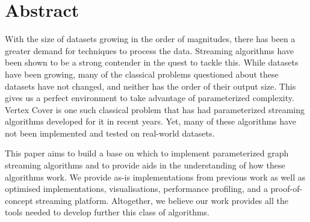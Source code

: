\section*{Abstract}

With the size of datasets growing in the order of magnitudes, there has been a
greater demand for techniques to process the data. Streaming algorithms have
been shown to be a strong contender in the quest to tackle this. While datasets
have been growing, many of the classical problems questioned about these
datasets have not changed, and neither has the order of their output size. This
gives us a perfect environment to take advantage of parameterized complexity.
Vertex Cover is one such classical problem that has had parameterized streaming
algorithms developed for it in recent years. Yet, many of these algorithms have
not been implemented and tested on real-world datasets.

This paper aims to build a base on which to implement parameterized graph
streaming algorithms and to provide aids in the understanding of how these
algorithms work. We provide as-is implementations from previous work as well as
optimised implementations, visualisations, performance profiling, and a
proof-of-concept streaming platform. Altogether, we believe our work provides
all the tools needed to develop further this class of algorithms.

\pagebreak
